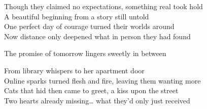 \begin{lyrics}
Though they claimed no expectations, something real took hold\\  
A beautiful beginning from a story still untold\\  
One perfect day of courage turned their worlds around\\  
Now distance only deepened what in person they had found  

The promise of tomorrow lingers sweetly in between  

From library whispers to her apartment door\\  
Online sparks turned flesh and fire, leaving them wanting more\\  
Cats that hid then came to greet, a kiss upon the street\\  
Two hearts already missing… what they’d only just received
\end{lyrics}

